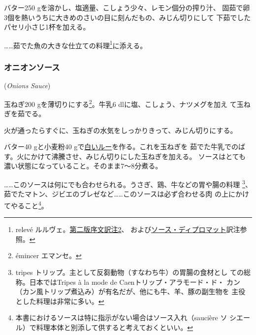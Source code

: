 \begin{recette}
バター250 gを溶かし、塩適量、こしょう少々、レモン\undemi{}個分の搾り汁、
固茹で卵3個を熱いうちに大きめのさいの目に刻んだもの、みじん切りにして
下茹でしたパセリ小さじ1杯を加える。

\ldots{}\ldots{}茹でた魚の大きな仕立ての料理\footnote{relevé
  ルルヴェ。\protect\hyperlink{releve}{第二版序文訳注2}、
  および\protect\hyperlink{sauce-diplomate}{ソース・ディプロマット}訳注参照。}に添える。

\maeaki

\hypertarget{onions-sauce}{%
\subsubsection{オニオンソース}\label{onions-sauce}}

 (\emph{Onions Sauce})


玉ねぎ200 gを薄切りにする\footnote{émincer エマンセ。}。牛乳6
dlに塩、こしょう、ナツメグを加え て玉ねぎを茹でる。

火が通ったらすぐに、玉ねぎの水気をしっかりきって、みじん切りにする。

バター40 gと小麦粉40
gで\protect\hyperlink{roux-blanc}{白いルー}を作る。これを玉ねぎを
茹でた牛乳でのばす。火にかけて沸騰させ、みじん切りにした玉ねぎを加える。
ソースはとても濃い状態になっていること。そのまま7〜8分煮る。

\ldots{}\ldots{}このソースは何にでも合わせられる。うさぎ、鶏、牛などの胃や腸の料理
\footnote{tripes
  トリップ。主として反芻動物（すなわち牛）の胃腸の食材とし
  ての総称。日本ではTripes à la mode de Caenトリップ・アラモード・ド・
  カン（カン風トリップ煮込み）が有名だが、他にも牛、羊、豚の副生物を
  主役とした料理は非常に多い。}、茹でたマトン、ジビエのブレゼなど\ldots{}\ldots{}このソースは必ず合わせる肉
の上にかけてやること\footnote{本書におけるソースは特に指示がない場合はソース入れ（saucière
  ソ シエール）で料理本体と別添して供すると考えておくといい。}。


\end{recette}
